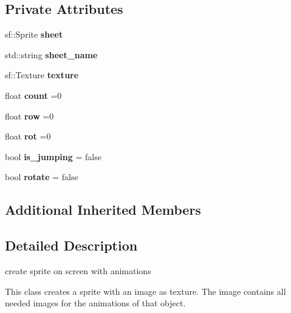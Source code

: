 \subsection*{Private Attributes}
\begin{DoxyCompactItemize}
\item 
\mbox{\label{classanimation_aa72ba079cfcb62b5dd7f6d74a9438516}} 
sf\+::\+Sprite {\bfseries sheet}
\item 
\mbox{\label{classanimation_a5406569ef9a8e47a8e50a927063613f6}} 
std\+::string {\bfseries sheet\+\_\+name}
\item 
\mbox{\label{classanimation_a9b49e5a7b856d127ea5481998c911fde}} 
sf\+::\+Texture {\bfseries texture}
\item 
\mbox{\label{classanimation_a50dde9518af0631ff1b86881a0e4c0ce}} 
float {\bfseries count} =0
\item 
\mbox{\label{classanimation_adaa2321a124fb03b2f4b3bd7af4e2127}} 
float {\bfseries row} =0
\item 
\mbox{\label{classanimation_a9a1d350886939f9e988d2786ca9709e7}} 
float {\bfseries rot} =0
\item 
\mbox{\label{classanimation_a8365683c0efa023b2bcb60b3fde9eeb2}} 
bool {\bfseries is\+\_\+jumping} = false
\item 
\mbox{\label{classanimation_a48077a46bbac0719c0a8227456620e14}} 
bool {\bfseries rotate} = false
\end{DoxyCompactItemize}
\subsection*{Additional Inherited Members}


\subsection{Detailed Description}
create sprite on screen with animations 

This class creates a sprite with an image as texture. The image contains all needed images for the animations of that object.

